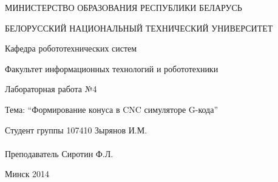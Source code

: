 \begin{titlepage} %

\thispagestyle{empty} %

\begin{center}
МИНИСТЕРСТВО ОБРАЗОВАНИЯ РЕСПУБЛИКИ БЕЛАРУСЬ

БЕЛОРУССКИЙ НАЦИОНАЛЬНЫЙ ТЕХНИЧЕСКИЙ УНИВЕРСИТЕТ

Кафедра робототехнических систем

Факультет информационных технологий и робототехники
\end{center}

\vfill

\begin{center}
Лабораторная работа №4

Тема: ``Формирование конуса в CNC симуляторе G-кода''
\end{center}

\vfill

\noindent
Студент группы 107410 \hfill Зырянов И.М.
\\
\\
\noindent
Преподаватель \hfill Сиротин Ф.Л.

\vfill

\centerline{Минск 2014}

\clearpage %

\end{titlepage}

\setcounter{page}{2}
